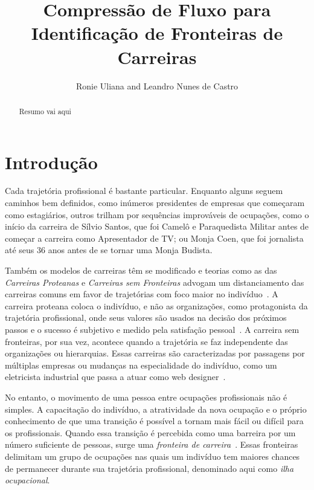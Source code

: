 \documentclass[
  article,
  11pt,
  a4paper,
  english,
  brazil,
  sumario=tradicional]{abntex2}
\title{Compressão de Fluxo para Identificação de Fronteiras de Carreiras}
\author{Ronie Uliana and Leandro Nunes de Castro}
\begin{document}

\frenchspacing

\maketitle

\begin{abstract}
Resumo vai aqui
\end{abstract}

\section{Introdução}

Cada trajetória profissional é bastante particular. Enquanto alguns seguem caminhos bem definidos, como inúmeros presidentes de empresas que começaram como estagiários, outros trilham por sequências improváveis de ocupações, como o início da carreira de Sílvio Santos, que foi Camelô e Paraquedista Militar antes de começar a carreira como Apresentador de TV; ou Monja Coen, que foi jornalista até seus 36 anos antes de se tornar uma Monja Budista.

Também os modelos de carreiras têm se modificado e teorias como as das \textit{Carreiras Proteanas} e \textit{Carreiras sem Fronteiras} advogam um distanciamento das carreiras comuns em favor de trajetórias com foco maior no indivíduo~\cite{Bendassolli2009-bg}. A carreira proteana coloca o indivíduo, e não as organizações, como protagonista da trajetória profissional, onde seus valores são usados na decisão dos próximos passos e o sucesso é subjetivo e medido pela satisfação pessoal~\cite{Hall2004-ke}. A carreira sem fronteiras, por sua vez, acontece quando a trajetória se faz independente das organizações ou hierarquias. Essas carreiras são caracterizadas por passagens por múltiplas empresas ou mudanças na especialidade do indivíduo, como um eletricista industrial que passa a atuar como web designer~\cite{Arthur1994-qq}.

No entanto, o movimento de uma pessoa entre ocupações profissionais não é simples. A capacitação do indivíduo, a atratividade da nova ocupação e o próprio conhecimento de que uma transição é possível a tornam mais fácil ou difícil para os profissionais. Quando essa transição é percebida como uma barreira por um número suficiente de pessoas, surge uma \textit{fronteira de carreira}~\cite{Gunz2007-hr}. Essas fronteiras delimitam um grupo de ocupações nas quais um indivíduo tem maiores chances de permanecer durante sua trajetória profissional, denominado aqui como \textit{ilha ocupacional}.
\end{document}
